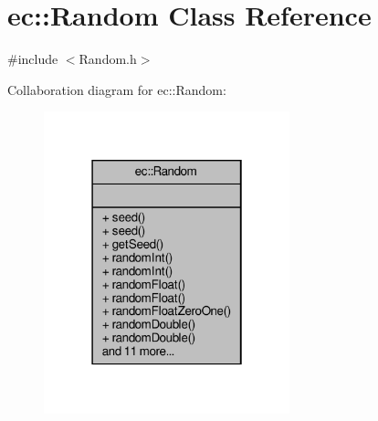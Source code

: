 \hypertarget{classec_1_1_random}{}\section{ec\+:\+:Random Class Reference}
\label{classec_1_1_random}


{\ttfamily \#include $<$Random.\+h$>$}



Collaboration diagram for ec\+:\+:Random\+:\nopagebreak
\begin{figure}[H]
\begin{center}
\leavevmode
\includegraphics[width=202pt]{classec_1_1_random__coll__graph}
\end{center}
\end{figure}
